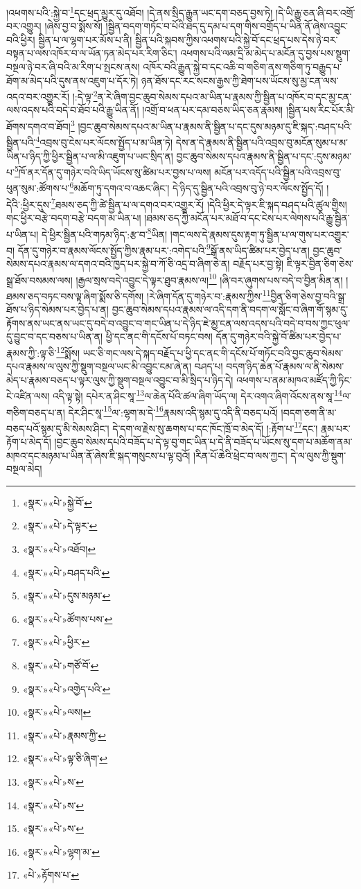 །འཕགས་པའི་:སྐྱེ་བ་\footnote{«སྣར་»«པེ་»སྐྱེ་བོ་}དང་ཕྲད་མྱུར་དུ་འཐོབ། །དེ་ནས་སྲིད་རྒྱུན་ཡང་དག་བཅད་བྱས་ཏེ། །དེ་ཡི་རྒྱུ་ཅན་ཞི་བར་འགྲོ་བར་འགྱུར། །ཞེས་བྱ་བ་སྨོས་སོ། །སྦྱིན་བདག་གཏོང་བ་པོའི་ཐད་དུ་དམ་པ་དག་གིས་བགྲོད་པ་ཡིན་ནོ་ཞེས་འབྱུང་བའི་ཕྱིར། སྦྱིན་པ་ལ་ལྷག་པར་མོས་པ་ནི། སྦྱིན་པའི་སྐབས་ཀྱིས་འཕགས་པའི་སྐྱེ་བོ་དང་ཕྲད་པས་དེས་ཉེ་བར་བསྟན་པ་ལས་འཁོར་བ་ལ་ཡོན་ཏན་མེད་པར་རིག་ཅིང་། འཕགས་པའི་ལམ་དྲི་མ་མེད་པ་མངོན་དུ་བྱས་པས་སྡུག་བསྔལ་ཉེ་བར་ཞི་བའི་མ་རིག་པ་སྤངས་ནས། འཁོར་བའི་རྒྱུན་སྐྱེ་བ་དང་འཆི་བ་གཅིག་ནས་གཅིག་ཏུ་བརྒྱུད་པ་ཐོག་མ་མེད་པའི་དུས་ནས་འཇུག་པ་དོར་ཏེ། ཉན་ཐོས་དང་རང་སངས་རྒྱས་ཀྱི་ཐེག་པས་ཡོངས་སུ་མྱ་ངན་ལས་འདའ་བར་འགྱུར་རོ། །:དེ་ལྟ་\footnote{«སྣར་»«པེ་»དེ་ལྟར་}ན་རེ་ཞིག་བྱང་ཆུབ་སེམས་དཔའ་མ་ཡིན་པ་རྣམས་ཀྱི་སྦྱིན་པ་འཁོར་བ་དང་མྱ་ངན་ལས་འདས་པའི་བདེ་བ་ཐོབ་པའི་རྒྱུ་ཡིན་ནོ། །འགྲོ་བ་ཕན་པར་དམ་བཅས་ཡིད་ཅན་རྣམས། །སྦྱིན་པས་རིང་པོར་མི་ཐོགས་དགའ་བ་ཐོབ།\footnote{«སྣར་»«པེ་»འཐོབ།} །བྱང་ཆུབ་སེམས་དཔའ་མ་ཡིན་པ་རྣམས་ནི་སྦྱིན་པ་དང་དུས་མཉམ་དུ་ཇི་སྐད་:བཤད་པའི་སྦྱིན་པའི་\footnote{«སྣར་»«པེ་»བཤད་པའི་}འབྲས་བུ་ངེས་པར་ལོངས་སྤྱོད་པ་མ་ཡིན་ཏེ། དེས་ན་དེ་རྣམས་ནི་སྦྱིན་པའི་འབྲས་བུ་མངོན་སུམ་པ་མ་ཡིན་པ་ཉིད་ཀྱི་ཕྱིར་སྦྱིན་པ་ལ་མི་འཇུག་པ་ཡང་སྲིད་ན། བྱང་ཆུབ་སེམས་དཔའ་རྣམས་ནི་སྦྱིན་པ་དང་:དུས་མཉམ་པ་\footnote{«སྣར་»«པེ་»དུས་མཉམ་}ཁོ་ནར་དོན་དུ་གཉེར་བའི་ཡིད་ཡོངས་སུ་ཚིམ་པར་བྱས་པ་ལས། མངོན་པར་འདོད་པའི་སྦྱིན་པའི་འབྲས་བུ་ཕུན་སུམ་:ཚོགས་པ་\footnote{«སྣར་»«པེ་»ཚོགས་པས་}མཆོག་ཏུ་དགའ་བ་འཆང་ཞིང་། དེ་ཉིད་དུ་སྦྱིན་པའི་འབྲས་བུ་ཉེ་བར་ལོངས་སྤྱོད་དོ། །དེའི་:ཕྱིར་དུས་\footnote{«སྣར་»«པེ་»ཕྱིར་}ཐམས་ཅད་ཀྱི་ཚེ་སྦྱིན་པ་ལ་དགའ་བར་འགྱུར་རོ། །དེའི་ཕྱིར་དེ་ལྟར་ཇི་སྐད་བཤད་པའི་ཚུལ་གྱིས། གང་ཕྱིར་བརྩེ་བདག་བརྩེ་བདག་མ་ཡིན་པ། །ཐམས་ཅད་ཀྱི་མངོན་པར་མཐོ་བ་དང་ངེས་པར་ལེགས་པའི་རྒྱུ་སྦྱིན་པ་ཡིན་པ། དེ་ཕྱིར་སྦྱིན་པའི་གཏམ་ཉིད་:རྩ་བ་\footnote{«སྣར་»«པེ་»གཙོ་བོ་}ཡིན། །གང་ལས་དེ་རྣམས་དུས་རྟག་ཏུ་སྦྱིན་པ་ལ་གུས་པར་འགྱུར་བ། དོན་དུ་གཉེར་བ་རྣམས་ལོངས་སྤྱོད་ཀྱིས་རྣམ་པར་:འགེད་པའི་\footnote{«སྣར་»«པེ་»འགྱེད་པའི་}སྒོ་ནས་ཡིད་ཚིམ་པར་བྱེད་པ་ན། བྱང་ཆུབ་སེམས་དཔའ་རྣམས་ལ་དགའ་བའི་ཁྱད་པར་སྐྱེ་བ་ཀོ་ཅི་འདྲ་བ་ཞིག་ཅེ་ན། བརྗོད་པར་བྱ་སྟེ། ཇི་ལྟར་བྱིན་ཅིག་ཅེས་སྒྲ་ཐོས་བསམས་ལས། །རྒྱལ་སྲས་བདེ་འབྱུང་དེ་ལྟར་ཐུབ་རྣམས་ལ།\footnote{«སྣར་»«པེ་»ལས།} །ཞི་བར་ཞུགས་པས་བདེ་བ་བྱིན་མིན་ན། །ཐམས་ཅད་བཏང་བས་ལྟ་ཞིག་སྨོས་ཅི་དགོས། །རེ་ཞིག་དོན་དུ་གཉེར་བ་:རྣམས་ཀྱིས་\footnote{«སྣར་»«པེ་»རྣམས་ཀྱི་}བྱིན་ཅིག་ཅེས་བྱ་བའི་སྒྲ་ཐོས་པ་ཉིད་སེམས་པར་བྱེད་པ་ན། བྱང་ཆུབ་སེམས་དཔའ་རྣམས་ལ་འདི་དག་ནི་བདག་ལ་སློང་བ་ཞིག་གོ་སྙམ་དུ་རྟོགས་ནས་ཡང་ནས་ཡང་དུ་བདེ་བ་འབྱུང་བ་གང་ཡིན་པ་དེ་ཉིད་ཇེ་མྱ་ངན་ལས་འདས་པའི་བདེ་བ་བས་ཀྱང་ཕུལ་དུ་བྱུང་བ་དང་བཅས་པ་ཡིན་ན། ཕྱི་དང་ནང་གི་དངོས་པོ་བཏང་བས། དོན་དུ་གཉེར་བའི་སྐྱེ་བོ་ཚིམ་པར་བྱེད་པ་རྣམས་ཀྱི་:ལྟ་ཅི་\footnote{«སྣར་»«པེ་»ལྟ་ཅི་ཞིག་}སྨོས། ཡང་ཅི་གང་ལས་དེ་སྐད་བརྗོད་པ་ཕྱི་དང་ནང་གི་དངོས་པོ་གཏོང་བའི་བྱང་ཆུབ་སེམས་དཔའ་རྣམས་ལ་ལུས་ཀྱི་སྡུག་བསྔལ་ཡང་མི་འབྱུང་ངམ་ཞེ་ན། བཤད་པ། བདག་ཉིད་ཆེན་པོ་རྣམས་ལ་ནི་སེམས་མེད་པ་རྣམས་བཅད་པ་ལྟར་ལུས་ཀྱི་སྡུག་བསྔལ་འབྱུང་བ་མི་སྲིད་པ་ཉིད་དེ། འཕགས་པ་ནམ་མཁའ་མཛོད་ཀྱི་ཏིང་ངེ་འཛིན་ལས། འདི་ལྟ་སྟེ། དཔེར་ན་ཤིང་སཱ་\footnote{«སྣར་»«པེ་»ས་}ལ་ཆེན་པོའི་ཚལ་ཞིག་ཡོད་ལ། དེར་འགའ་ཞིག་འོངས་ནས་སཱ་\footnote{«སྣར་»«པེ་»ས་}ལ་གཅིག་བཅད་པ་ན། དེར་ཤིང་སཱ་\footnote{«སྣར་»«པེ་»ས་}ལ་:ལྷག་མ་དེ་\footnote{«སྣར་»«པེ་»ལྷག་མ་}རྣམས་འདི་སྙམ་དུ་འདི་ནི་བཅད་པའོ། །བདག་ཅག་ནི་མ་བཅད་པའོ་སྙམ་དུ་མི་སེམས་ཤིང་། དེ་དག་ལ་རྗེས་སུ་ཆགས་པ་དང་ཁོང་ཁྲོ་བ་མེད་དོ། །:རྟོག་པ་\footnote{«པེ་»རྟོགས་པ་}དང་། རྣམ་པར་རྟོག་པ་མེད་དོ། །བྱང་ཆུབ་སེམས་དཔའི་བཟོད་པ་དེ་ལྟ་བུ་གང་ཡིན་པ་དེ་ནི་བཟོད་པ་ཡོངས་སུ་དག་པ་མཆོག་ནམ་མཁའ་དང་མཉམ་པ་ཡིན་ནོ་ཞེས་ཇི་སྐད་གསུངས་པ་ལྟ་བུའོ། །རིན་པོ་ཆེའི་ཕྲེང་བ་ལས་ཀྱང་། དེ་ལ་ལུས་ཀྱི་སྡུག་བསྔལ་མེད། 